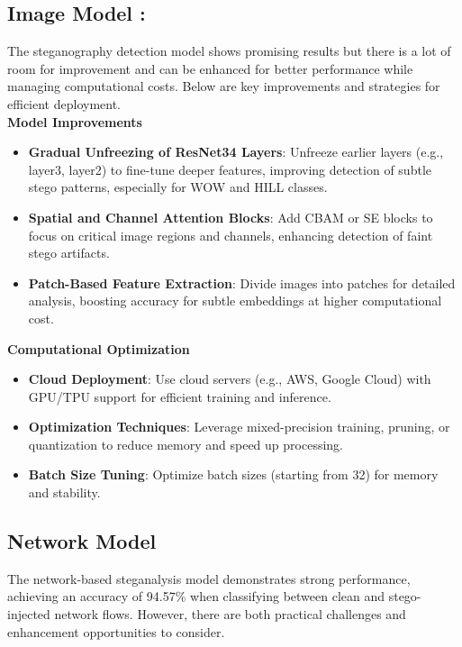 \documentclass[12pt]{article}
\begin{document}
\subsection{Image Model : }


The steganography detection model shows promising results but there is a lot of room for improvement and can be enhanced for better performance while managing computational costs. Below are key improvements and strategies for efficient deployment.\\ 

\textbf{Model Improvements} 
\begin{itemize}
    \item \textbf{Gradual Unfreezing of ResNet34 Layers}: Unfreeze earlier layers (e.g., layer3, layer2) to fine-tune deeper features, improving detection of subtle stego patterns, especially for WOW and HILL classes.
    \item \textbf{Spatial and Channel Attention Blocks}: Add CBAM or SE blocks to focus on critical image regions and channels, enhancing detection of faint stego artifacts.
    \item \textbf{Patch-Based Feature Extraction}: Divide images into patches for detailed analysis, boosting accuracy for subtle embeddings at higher computational cost.
\end{itemize}

\textbf{Computational Optimization}
\begin{itemize}
    \item \textbf{Cloud Deployment}: Use cloud servers (e.g., AWS, Google Cloud) with GPU/TPU support for efficient training and inference.
    \item \textbf{Optimization Techniques}: Leverage mixed-precision training, pruning, or quantization to reduce memory and speed up processing.
    \item \textbf{Batch Size Tuning}: Optimize batch sizes (starting from 32) for memory and stability.
\end{itemize}

\subsection{Network Model}

The network-based steganalysis model demonstrates strong performance, achieving an accuracy of 94.57\% when classifying between clean and stego-injected network flows. However, there are both practical challenges and enhancement opportunities to consider.
\end{document}
